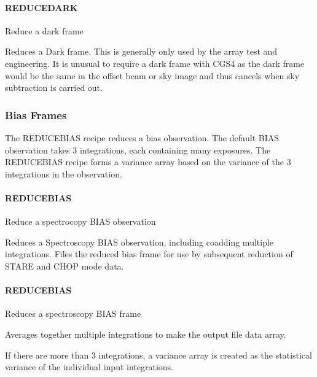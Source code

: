 \documentclass[twoside,11pt]{article}
\renewcommand{\_}{\texttt{\symbol{95}}}
\begin{document}
\paragraph{REDUCE\_DARK\label{REDUCE_DARK}}

Reduce a dark frame


\mbox{}

Reduces a Dark frame. This is generally only used by the array test
and engineering. It is unusual to require a dark frame with CGS4 as
the dark frame would be the same in the offset beam or sky image and
thus cancels when sky subtraction is carried out.


\subsubsection{Bias Frames}

The REDUCE\_BIAS recipe reduces a bias observation. The default BIAS
observation takes 3 integrations, each containing many exposures. The
REDUCE\_BIAS recipe forms a variance array based on the variance of the
3 integrations in the observation.


\paragraph{REDUCE\_BIAS\label{REDUCE_BIAS}}

Reduce a spectrocopy BIAS observation


\mbox{}

Reduces a Spectroscopy BIAS observation, including coadding multiple
integrations. Files the reduced bias frame for use by subsequent
reduction of STARE and CHOP mode data.


\paragraph{\_REDUCE\_BIAS\_\label{_REDUCE_BIAS_}}

Reduces a spectroscopy BIAS frame


\mbox{}

Averages together multiple integrations to make the output file data array.



If there are more than 3 integrations, a variance array is created as the
statistical variance of the individual input integrations.
\end{document}
